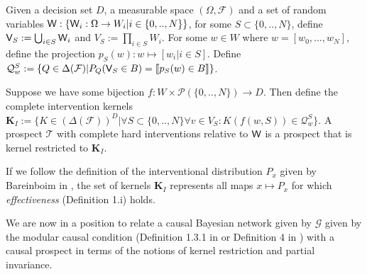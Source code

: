 \begin{definition}
Given a decision set $D$, a measurable space $(\Omega,\mathcal{F})$ and a set of random variables $\mathsf{W}:\{\mathsf{W}_i:\Omega\to W_i|i\in \{0,..,N\}\}$, for some $S\subset\{0,..,N\}$, define $\mathsf{V}_S:=\bigcup_{i\in S} \mathsf{W}_i$ and $V_S:=\prod_{i\in S} W_i$. For some $w\in W$ where $w=[w_0,...,w_N]$, define the projection $p_S(w):w\mapsto [w_i|i\in S]$. Define $\mathcal{Q}^{S}_{w} := \{Q\in \Delta(\mathcal{F})|P_Q(\mathsf{V}_S\in B) = \llbracket p_S(w)\in B\rrbracket\}$.

Suppose we have some bijection $f:W\times \mathscr{P}(\{0,..,N\})\to D$. Then define the complete intervention kernels $\mathbf{K}_I:= \{K\in (\Delta(\mathcal{F}))^D|\forall S\subset\{0,..,N\} \forall v\in V_S: K(f(w,S))\in \mathcal{Q}^{S}_w\}$. A prospect $\mathscr{T}$ with complete hard interventions relative to $\mathsf{W}$ is a prospect that is kernel restricted to $\mathbf{K}_I$.

If we follow the definition of the interventional distribution $P_x$ given by Bareinboim in \cite{bareinboim_local_2012}, the set of kernels $\mathbf{K}_I$ represents all maps $x\mapsto P_x$ for which \emph{effectiveness} (Definition 1.i) holds.
\end{definition}



We are now in a position to relate a causal Bayesian network given by $\mathcal{G}$ given by the modular causal condition (Definition 1.3.1 in \cite{pearl_causality:_2009} or Definition 4 in \cite{bareinboim_local_2012}) with a causal prospect in terms of the notions of kernel restriction and partial invariance.

